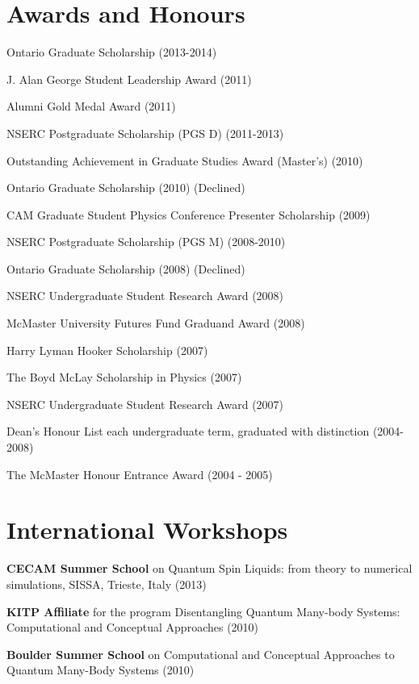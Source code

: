 \documentclass[letterpaper]{article}
\renewenvironment{itemize}{
  \begin{list}{}{
    \setlength{\leftmargin}{1.5em}
  }
}{
  \end{list}
}
\begin{document}
\section*{Awards and Honours}

\begin{itemize}

\item Ontario Graduate Scholarship (2013-2014)
\item J. Alan George Student Leadership Award (2011)
\item Alumni Gold Medal Award (2011)
\item NSERC Postgraduate Scholarship (PGS D) (2011-2013)
\item Outstanding Achievement in Graduate Studies Award (Master's) (2010)
\item Ontario Graduate Scholarship (2010) (Declined)
\item CAM Graduate Student Physics Conference Presenter Scholarship (2009)
\item NSERC Postgraduate Scholarship (PGS M) (2008-2010)
\item Ontario Graduate Scholarship (2008) (Declined)
\item NSERC Undergraduate Student Research Award (2008)
\item McMaster University Futures Fund Graduand Award (2008)
\item Harry Lyman Hooker Scholarship (2007)
\item The Boyd McLay Scholarship in Physics (2007)
\item NSERC Undergraduate Student Research Award (2007)
\item Dean's Honour List each undergraduate term, graduated with distinction (2004-2008)
\item The McMaster Honour Entrance Award (2004 - 2005)
\end{itemize}

\section*{International Workshops}

\begin{itemize}

\item {\bf CECAM Summer School} on Quantum Spin Liquids: from theory to numerical simulations, SISSA, Trieste, Italy (2013)

\item {\bf KITP Affiliate} for the program Disentangling Quantum Many-body Systems: Computational and Conceptual Approaches (2010)

\item {\bf Boulder Summer School} on Computational and Conceptual Approaches
to Quantum Many-Body Systems (2010)

\end{itemize}
\end{document}
